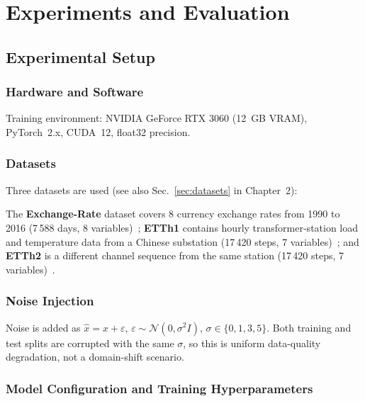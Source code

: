 \chapter{Experiments and Evaluation}
\label{ch:kiserletek}

\section{Experimental Setup}
\label{sec:exp_setup}

\subsection{Hardware and Software}

Training environment: NVIDIA GeForce RTX 3060 (12~GB VRAM), PyTorch~2.x,
CUDA~12, float32 precision.

\subsection{Datasets}
\label{sec:exp_datasets}

Three datasets are used (see also Sec.~\ref{sec:datasets} in Chapter~2):

The \textbf{Exchange-Rate} dataset covers 8 currency exchange rates from
1990 to 2016 (7\,588 days, 8 variables)~\cite{lai2018modeling};
\textbf{ETTh1} contains hourly transformer-station load and temperature data
from a Chinese substation (17\,420 steps,
7 variables)~\cite{zhou2021informer}; and \textbf{ETTh2} is a different
channel sequence from the same station
(17\,420 steps, 7 variables)~\cite{zhou2021informer}.

\subsection{Noise Injection}

Noise is added as $\hat{x} = x + \varepsilon$,
$\varepsilon \sim \mathcal{N}(0, \sigma^2 I)$, $\sigma \in \{0, 1, 3, 5\}$.
Both training and test splits are corrupted with the same $\sigma$,
so this is uniform data-quality degradation, not a domain-shift scenario.

\subsection{Model Configuration and Training Hyperparameters}

